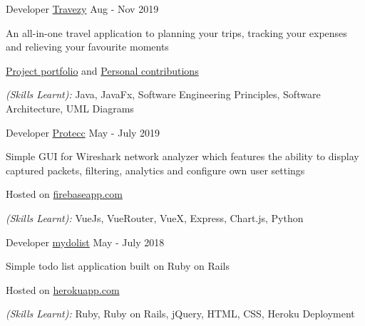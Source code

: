 

\begin{cventries}

  \cventry
    {Developer} %
    {\href{https://github.com/bjhoohaha/main}{Travezy}} %
    {} %
    {Aug - Nov 2019} %
    {
      \begin{cvitems} %
        \item {An all-in-one travel application to planning your trips, tracking your expenses and relieving your favourite moments}
        \item {\textcolor{eduDft-darkblue}{\href{https://ay1920s1-cs2103t-t17-2.github.io/main/index.html}{Project portfolio}} and  \textcolor{eduDft-darkblue}{\href{https://ay1920s1-cs2103t-t17-2.github.io/main/team/bjhoohaha.html}{Personal contributions}}}
        \item {\textit{(Skills Learnt):} Java, JavaFx, Software Engineering Principles, Software Architecture, UML Diagrams}
      \end{cvitems}
    }

  \cventry
    {Developer} %
    {\href{https://github.com/bjhoohaha/Protecc}{Protecc}} %
    {} %
    {May - July 2019} %
    {
      \begin{cvitems} %
        \item {Simple GUI for Wireshark network analyzer which features the ability to display captured packets, filtering, analytics and configure own user settings}
        \item {Hosted on {\textcolor{eduDft-darkblue}{\href{https://employee-
        manager-66213.firebaseapp.com}{firebaseapp.com}}}}
        \item {\textit{(Skills Learnt):} VueJs, VueRouter, VueX, Express, Chart.js, Python}
      \end{cvitems}
    }

  \cventry
    {Developer} %
    {\href{https://github.com/bjhoohaha/mydo/tree/master/mydolist}{mydolist}} %
    {} %
    {May - July 2018} %
    {
      \begin{cvitems} %
        \item {Simple todo list application built on Ruby on Rails}
        \item {Hosted on {\textcolor{eduDft-darkblue}{\href{https://vast-taiga-58297.herokuapp.com/tasks}{herokuapp.com}}}}
        \item {\textit{(Skills Learnt):} Ruby, Ruby on Rails, jQuery, HTML, CSS, Heroku Deployment}
      \end{cvitems}
    }

\end{cventries}
